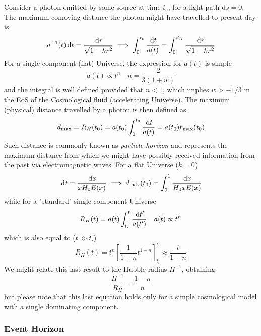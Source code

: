 Consider a photon emitted by some source at time $t_{e}$, for a light path $\text{d}s = 0$. The maximum comoving distance the photon might have travelled to present day is
\begin{equation}
   a^{-1}(t)\,\text{d}t = \frac{\,\text{d}r}{\sqrt{1-kr^{2}}} \implies \int_{0}^{t_{0}}\frac{\,\text{d}t}{a(t)} = \int_{0}^{d_{H}}\frac{\,\text{d}r}{\sqrt{1-kr^{2}}}
\end{equation}
For a single component (flat) Universe, the expression for $a(t)$ is simple
\begin{equation}
    a(t) \propto t^{n} \quad n = \frac{2}{3(1+w)}
\end{equation}
and the integral is well defined provided that $n < 1$, which implies $w > -1/3$ in the EoS of the Cosmological fluid (accelerating Universe). The maximum (physical) distance travelled by a photon is then defined as 
\begin{equation}
    d_{\text{max}} = R_{H}(t_{0}) = a(t_{0})\int_{0}^{t_{0}}\frac{\,\text{d}t}{a(t)} = a(t_{0})\tilde{r}_{\text{max}}(t_{0})
\end{equation}
Such distance is commonly known as \emph{particle horizon} and represents the maximum distance from which we might have possibly received information from the past via electromagnetic waves. For a flat Universe ($k=0$) 
\begin{equation}
    \,\text{d}t = \frac{\,\text{d}x}{xH_{0}E(x)} \implies d_{\text{max}}(t_{0}) = \int_{0}^{1}\frac{\,\text{d}x}{H_{0}xE(x)}
\end{equation}
while for a "standard" single-component Universe
\begin{equation}
    R_{H}(t) = a(t)\int_{t_{i}}^{t}\frac{\,\text{d}t'}{a(t')} \quad a(t)\propto t^{n}
\end{equation}
which is also equal to ($t \gg t_{i}$)
\begin{equation}
    R_{H}(t) = t^{n}\left[\frac{1}{1-n}t^{1-n}\right]^{t}_{t_{i}} \approx \frac{t}{1-n}
\end{equation}
We might relate this last result to the Hubble radius $H^{-1}$, obtaining
\begin{equation}
    \frac{H^{-1}}{R_{H}} = \frac{1-n}{n}
\end{equation}
but please note that this last equation holds only for a simple cosmological model with a single dominating component.

\subsubsection{Event Horizon}

